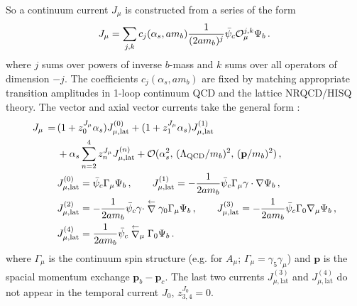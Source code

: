 So a continuum current $J_{\mu}$ is constructed from a series of the form
\begin{align}
  J_{\mu} = \sum_{j,k} c_j(\alpha_s,am_b) {1\over (2am_b)^j} \bar{\psi}_c \mathcal{O}^{j,k}_{\mu} \Psi_b\,.
\end{align}
where $j$ sums over powers of inverse $b$-mass and $k$ sums over all operators of dimension $-j$. The coefficients $c_j(\alpha_s,am_b)$ are fixed by matching appropriate transition amplitudes in 1-loop continuum QCD and the lattice NRQCD/HISQ theory. The vector and axial vector currents take the general form \cite{Morningstar:1998yx}:
\begin{align}
	J_{\mu} \,=\, & ( 1 + z^{J_{\mu}}_0 \alpha_s ) J_{\mu,\text{lat}}^{(0)} + ( 1 + z^{J_{\mu}}_1 \alpha_s ) J_{\mu,\text{lat}}^{(1)} \nonumber \\ &+ \alpha_s \sum_{n=2}^4 z^{J_{\mu}}_n J_{\mu,\text{lat}}^{(n)} + \mathcal{O}( \alpha_s^2,\, (\Lambda_{\text{QCD}}/m_b)^2,\, ({\textbf{p}}/m_b)^2 )\,,
	\label{eq:nrqcd-hisq-current}
        \\
        & J_{\mu,\text{lat}}^{(0)} = \bar{\psi}_c \Gamma_{\mu} \Psi_b\,,
        \quad\quad J_{\mu,\text{lat}}^{(1)} = -{1\over 2am_b} \bar{\psi}_c \Gamma_{\mu} \gamma\cdot \nabla \Psi_b\,,
        \nonumber
        \\
        & J_{\mu,\text{lat}}^{(2)} = -{1\over 2am_b} \bar{\psi}_c \gamma\cdot \stackrel{\leftarrow}{\nabla} \gamma_0 \Gamma_{\mu} \Psi_b\,,
        \quad\quad J_{\mu,\text{lat}}^{(3)} = -{1\over 2am_b}  \bar{\psi}_c \Gamma_0 \nabla_{\mu} \Psi_b\,,
        \nonumber
        \\
        & J_{\mu,\text{lat}}^{(4)} = {1\over 2am_b} \bar{\psi}_c \stackrel{\leftarrow}{\nabla}_{\mu} \Gamma_0 \Psi_b\,.
        \nonumber
\end{align}
where $\Gamma_{\mu}$ is the continuum spin structure (e.g. for $A_{\mu}$; $\Gamma_{\mu}=\gamma_5\gamma_{\mu}$) and ${\textbf{p}}$ is the spacial momentum exchange ${\textbf{p}}_b-{\textbf{p}}_c$. The last two currents $J^{(3)}_{\mu,\text{lat}}$ and $J^{(4)}_{\mu,\text{lat}}$ do not appear in the temporal current $J_0$, $z_{3,4}^{J_0} = 0$.

